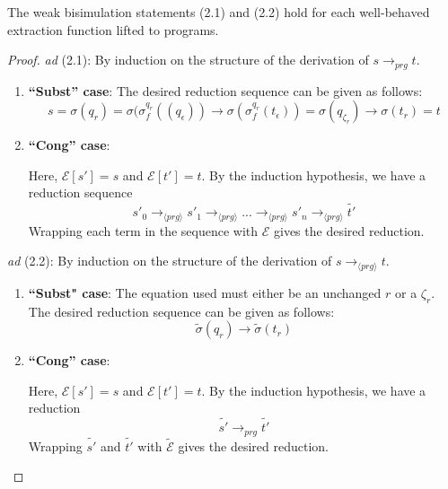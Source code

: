 \begin{proposition}
The weak bisimulation statements (2.1) and (2.2) hold for each well-behaved extraction function lifted to programs.

\begin{proof}
\textit{ad} (2.1): By induction on the structure of the derivation of $s \longrightarrow_{prg} t$.
\begin{enumerate}
\item \textbf{``Subst'' case}: The desired reduction sequence can be given as follows:
\[
s = \sigma(q_r) = \sigma(\sigma^{q_r}_f((q_\epsilon)) \longrightarrow \sigma(\sigma^{q_r}_f(t_\epsilon)) = \sigma(q_{\zeta_r}) \longrightarrow \sigma(t_r) = t
\]

\item \textbf{``Cong'' case}:
\begin{prooftree}
\end{prooftree}

Here, $\mathcal{E}[s'] = s$ and $\mathcal{E}[t'] = t$. By the induction hypothesis, we have a reduction sequence
\[
s'_0 \longrightarrow_{\langle prg \rangle} s'_1 \longrightarrow_{\langle prg \rangle} ... \longrightarrow_{\langle prg \rangle} s'_n \longrightarrow_{\langle prg \rangle} \widetilde{t'}
\]
Wrapping each term in the sequence with $\mathcal{E}$ gives the desired reduction.
\end{enumerate}

\textit{ad} (2.2): By induction on the structure of the derivation of $s \longrightarrow_{\langle prg \rangle} t$.
\begin{enumerate}
\item \textbf{``Subst" case}: The equation used must either be an unchanged $r$ or a $\zeta_r$. The desired reduction sequence can be given as follows:
\[
\widetilde{\sigma}(q_r) \longrightarrow \widetilde{\sigma}(t_r)
\]

\item \textbf{``Cong'' case}:
\begin{prooftree}
\end{prooftree}

Here, $\mathcal{E}[s'] = s$ and $\mathcal{E}[t'] = t$. By the induction hypothesis, we have a reduction
\[
\widetilde{s'} \longrightarrow_{prg} \widetilde{t'}
\]
Wrapping $\widetilde{s'}$ and $\widetilde{t'}$ with $\widetilde{\mathcal{E}}$ gives the desired reduction.
\end{enumerate}
\end{proof}
\end{proposition}

